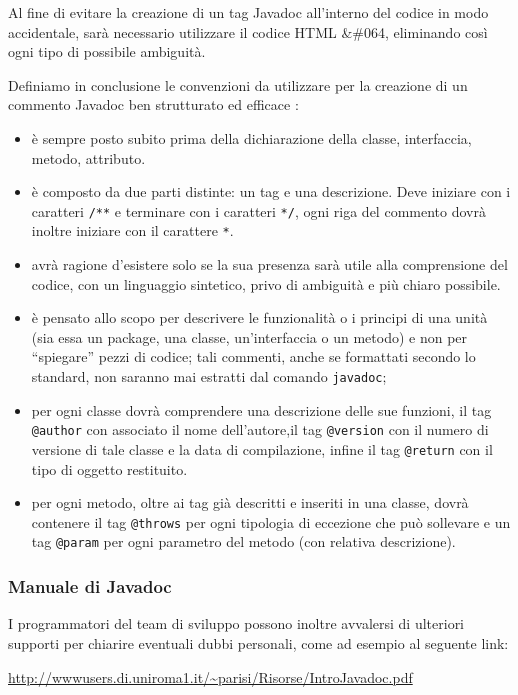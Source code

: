 {\begin{itemize}
\end{itemize}

Al fine di evitare la creazione di un tag Javadoc all'interno del codice in modo accidentale, sarà necessario utilizzare il codice HTML \&\#064, eliminando così ogni tipo di possibile ambiguità.

Definiamo in conclusione le convenzioni da utilizzare per la creazione di un commento Javadoc ben strutturato ed efficace :

\begin{itemize}
	\item è sempre posto subito prima della dichiarazione della classe, interfaccia, metodo, attributo.	
	\item è composto da due parti distinte: un tag e una descrizione. Deve iniziare con i caratteri \verb+/**+ e terminare con i caratteri \verb+*/+, ogni riga del commento dovrà inoltre iniziare con il carattere \verb+*+.
	\item avrà ragione d'esistere solo se la sua presenza sarà utile alla comprensione del codice, con un linguaggio sintetico, privo di ambiguità e più chiaro possibile.
	\item  è pensato allo scopo per descrivere le funzionalità o i principi di una unità (sia essa un package, una classe, un'interfaccia o un metodo) e non per ``spiegare'' pezzi di codice; tali commenti, anche se formattati secondo lo standard, non saranno mai estratti dal comando \texttt{javadoc};
	\item per ogni classe dovrà comprendere una descrizione delle sue funzioni, il tag \verb+@author+ con associato il nome dell'autore,il tag \verb+@version+ con il numero di versione di tale classe e la data di compilazione, infine il tag \verb+@return+ con il tipo di oggetto restituito.
	\item per ogni metodo, oltre ai tag già descritti e inseriti in una classe, dovrà contenere il tag \verb+@throws+ per ogni tipologia di eccezione che può sollevare e un tag \verb+@param+ per ogni parametro del metodo (con relativa descrizione).
\end{itemize}

\subsubsection{Manuale di Javadoc}

I programmatori del team di sviluppo possono inoltre avvalersi di ulteriori supporti per chiarire eventuali dubbi personali, come ad esempio al seguente link:
\begin{center}
\url{http://wwwusers.di.uniroma1.it/~parisi/Risorse/IntroJavadoc.pdf}
\end{center}

}
